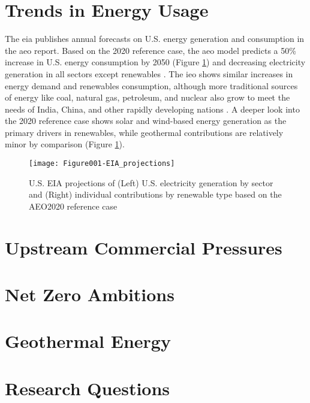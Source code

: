 \section{Trends in Energy Usage}\label{ch1:trends}
The \acrlong{eia} publishes annual forecasts on U.S. energy generation and consumption in the \acrlong{aeo} report. Based on the 2020 reference case, the \acrshort{aeo} model predicts a 50\% increase in U.S. energy consumption by 2050 (Figure \ref{fig:eia_2021_projections}) and decreasing electricity generation in all sectors except renewables \citep{us_energy_information_administration_annual_2021}. The \acrlong{ieo} shows similar increases in energy demand and renewables consumption, although more traditional sources of energy like coal, natural gas, petroleum, and nuclear also grow to meet the needs of India, China, and other rapidly developing nations \citep{us_energy_information_administration_international_2020}. A deeper look into the 2020 reference case shows solar and wind-based energy generation as the primary drivers in renewables, while geothermal contributions are relatively minor by comparison (Figure \ref{fig:eia_2021_projections}). 
\begin{figure}[htp]
\centering
\texttt{[image: Figure001-EIA\_projections]}
\caption[U.S. EIA projections based on the AEO2020 reference case]{U.S. EIA projections of (Left) U.S. electricity generation by sector and (Right) individual contributions by renewable type based on the AEO2020 reference case \protect\citep{us_energy_information_administration_annual_2021}}
\label{fig:eia_2021_projections}
\end{figure}


\section{Upstream Commercial Pressures}\label{ch1:upstream}


\section{Net Zero Ambitions}\label{ch1:netzero}


\section{Geothermal Energy}\label{ch1:geothermal}

\section{Research Questions}\label{ch1:researchqs}


